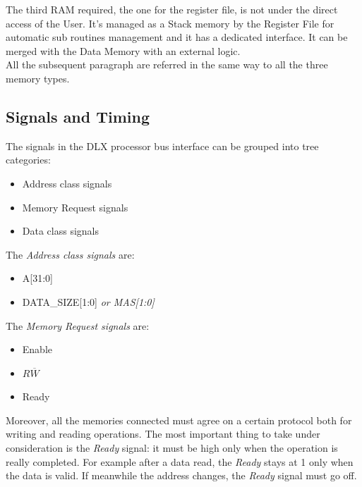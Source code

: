 The third RAM required, the one for the register file, is not under the direct access of the User. It's managed as a Stack memory by the Register File for automatic sub routines management and it has a dedicated interface. It can be merged with the Data Memory with an external logic.\\


All the subsequent paragraph are referred in the same way to all the three memory types.

\subsection{Signals and Timing}
The signals in the DLX processor bus interface can be grouped into tree categories:
\begin{itemize}
    \item Address class signals
    \item Memory Request signals
    \item Data class signals
\end{itemize}

The \emph{Address class signals} are:
\begin{itemize}
    \item A{[31:0]}
    \item DATA\_SIZE{[1:0]} \emph{or MAS{[1:0]}}
\end{itemize}

The \emph{Memory Request signals} are:
\begin{itemize}
    \item Enable
    \item $R\overline{W}$
    \item Ready
\end{itemize}

Moreover, all the memories connected must agree on a certain protocol both for writing and reading operations. The most important thing to take under consideration is the \emph{Ready} signal: it must be high only when the operation is really completed. For example after a data read, the \emph{Ready} stays at 1 only when the data is valid. If meanwhile the address changes, the \emph{Ready} signal must go off.

